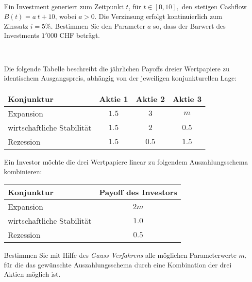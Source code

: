 \subsection*{}
Ein Investment generiert zum Zeitpunkt $ t $, für $ t \in [0,10], $ den stetigen Cashflow $ B(t) = a \ t + 10 $,
wobei $ a > 0  $.
Die Verzinsung erfolgt kontinuierlich zum Zinssatz $ i = 5 \% $.
Bestimmen Sie den Parameter $ a $ so, dass der Barwert des Investments $ 1'000 $ CHF beträgt.
\\
\\
\subsection*{}
Die folgende Tabelle beschreibt die jährlichen Payoffs dreier Wertpapiere zu identischem Ausgangspreis, abhängig von der jeweiligen konjunkturellen Lage:
\begin{table}[H]
	\centering
		\begin{tabular}{l c c c}
			\hline
			Konjunktur & Aktie 1  &  Aktie 2 &  Aktie 3 \\ \hline
			Expansion & $ 1.5 $ & $ 3 $ & $ m $  \\ 
			wirtschaftliche Stabilität & $ 1.5 $ & $ 2 $ & $ 0.5 $ \\ 
			Rezession & $ 1.5 $ & $ 0.5 $ & $ 1.5 $  \\ \hline
		\end{tabular}%
	
\end{table}
Ein Investor möchte die drei Wertpapiere linear zu folgendem Auszahlungsschema kombinieren:
\begin{table}[H]
	\centering
	\begin{tabular}{l c }
		\hline
		Konjunktur & Payoff des Investors \\ \hline
		Expansion & $ 2m $  \\ 
		wirtschaftliche Stabilität & $ 1.0 $  \\ 
		Rezession & $ 0.5 $   \\ \hline
	\end{tabular}%
	
\end{table}
Bestimmen Sie mit Hilfe des \textit{Gauss Verfahrens} alle möglichen Parameterwerte $ m $, für die das gewünschte Auszahlungsschema durch eine Kombination der drei Aktien möglich ist.
 \\
\\
